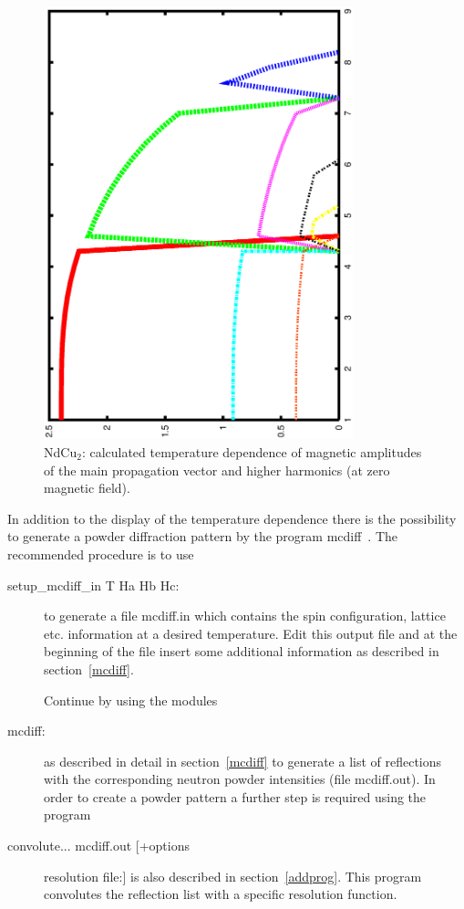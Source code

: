 \begin{figure}[htb]%
\begin{center}\leavevmode
\includegraphics[angle=-90, width=0.8\textwidth]{figsrc/ndcu2b/resultss/hkl.ps}
\end{center}
\caption{NdCu$_2$: calculated temperature dependence of magnetic amplitudes of the
main propagation vector and higher harmonics (at zero magnetic field).}
\label{neutintgraphic}
\end{figure}

In addition to the display of the temperature dependence there is the
possibility to generate a powder diffraction pattern by the 
program mcdiff~. The 
recommended procedure is to use 

\begin{description}
\item[{\prg setup\_mcdiff\_in} T Ha Hb Hc:] to generate a file {\prg mcdiff.in} which
contains the spin configuration, lattice etc. information at a
desired temperature. Edit this output file and at the beginning
of the file insert some additional information as described in section~\ref{mcdiff}.

Continue by using  the modules
\item[{\prg mcdiff}:] as described in detail in section~\ref{mcdiff} to
generate a list of reflections with the corresponding neutron powder
intensities (file {\prg mcdiff.out}). In order to create a powder pattern 
a further step is required using the program
\item[{\prg convolute}... mcdiff.out [+options] resolution file:]
  is also described in section~\ref{addprog}. This program convolutes the
reflection list with a specific resolution function.
\end{description}

